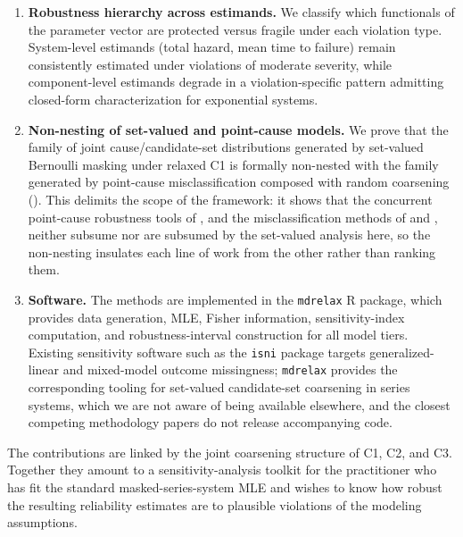 \begin{enumerate}
    \item \textbf{Robustness hierarchy across estimands.} We classify which
        functionals of the parameter vector are protected versus fragile
        under each violation type. System-level estimands (total hazard,
        mean time to failure) remain consistently estimated under
        violations of moderate severity, while component-level estimands
        degrade in a violation-specific pattern admitting closed-form
        characterization for exponential systems.

    \item \textbf{Non-nesting of set-valued and point-cause models.} We
        prove that the family of joint cause/candidate-set distributions
        generated by set-valued Bernoulli masking under relaxed C1 is
        formally non-nested with the family generated by point-cause
        misclassification composed with random coarsening
        (). This delimits the scope of the framework:
        it shows that the concurrent point-cause robustness tools of
        \citet{Bakoyannis2025}, and the misclassification methods of
        \citet{MorenoBetancur2015} and \citet{VanRompaye2012}, neither
        subsume nor are subsumed by the set-valued analysis here, so the
        non-nesting insulates each line of work from the other rather than
        ranking them.

    \item \textbf{Software.} The methods are implemented in the
        \texttt{mdrelax} R package, which provides data generation, MLE,
        Fisher information, sensitivity-index computation, and
        robustness-interval construction for all model tiers. Existing
        sensitivity software such as the \texttt{isni} package
        \citep{XieGaoHeitjan2018} targets generalized-linear and
        mixed-model outcome missingness; \texttt{mdrelax} provides the
        corresponding tooling for set-valued candidate-set coarsening in
        series systems, which we are not aware of being available
        elsewhere, and the closest competing methodology papers
        \citep{MorenoBetancur2015, BakoyannisYiannoutsos2015,
        ZhangHeitjan2006, Bakoyannis2025} do not release accompanying code.
\end{enumerate}

The contributions are linked by the joint coarsening structure of C1, C2,
and C3. Together they amount to a sensitivity-analysis toolkit for the
practitioner who has fit the standard masked-series-system MLE and wishes
to know how robust the resulting reliability estimates are to plausible
violations of the modeling assumptions.

